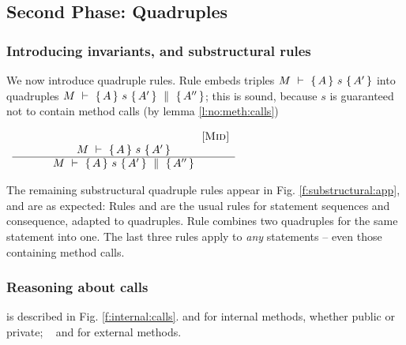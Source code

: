 
\subsection{Second Phase: Quadruples}

\subsubsection{Introducing invariants, and substructural rules}
We now introduce  quadruple rules. %
Rule {} embeds  triples  ${M\ \vdash\ \{\,A\, \} \ s\  \{\,A'\, \} }$  into quadruples ${M\ \vdash\ \{\,A\, \} \ s\  \{\,A'\, \}\, \,\parallel\,\, \{\, A'' \, \} }$; this is sound, because $s$ is guaranteed not to contain method calls (by lemma \ref{l:no:meth:calls})

\begin{center}
$
\begin{array}{c}
\begin{array}{c} \strut \ \ \ \ \ \ \ \ \ \ \ \ \ \ \ \ \ \ \ \ \ \ \ \ \ \ \ \ \ \ \ \ \ \ \ \ \ \ \ \ \ \ \ \ \ \ \ \ \ \ {{\mbox{[\sc{Mid}]}}} \\ M\ \vdash\ \{\,A\, \} \ s\  \{\,A'\, \}  \\ \hline M\ \vdash\ \{\,A\, \} \ s\  \{\,A'\, \}\, \,\parallel\,\, \{\, A'' \, \}  \end{array}
  \end{array}
 $
 \end{center}
 
The remaining substructural quadruple rules appear in  Fig. \ref{f:substructural:app}, and are as expected: 
Rules   {} and {} are  the usual rules for statement sequences and consequence, adapted to quadruples.
Rule {} combines two quadruples for the same statement into one.
The last three  rules  apply to \emph{any} statements -- even those containing method calls.



\subsubsection{Reasoning about   calls}
\label{s:calls}
is described in Fig. \ref{f:internal:calls}. {}  and {}  for internal methods, whether public or private; \ %
and {} for  external methods.




